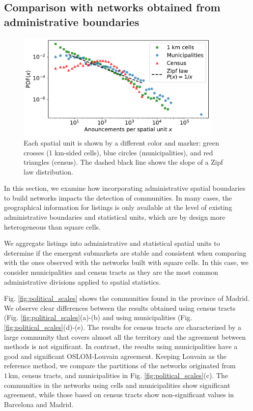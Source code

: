 \subsection{Comparison with networks obtained from administrative boundaries}\label{sec:political spatial units}

\begin{figure}
    \label{fig:distribution_announcements}
    \centering
    \includegraphics[width = 0.9\textwidth]{Figs/Idealista_segmentation/Distribution_adds_census_cell.pdf}
	\caption[Distribution of listings for different spatial units.]{ Each spatial unit is shown by a different color and marker: green crosses (1 km-sided cells), blue circles (municipalities), and red triangles (census). The dashed black line shows the slope of a Zipf law distribution.}
\end{figure}

In this section, we examine how incorporating administrative spatial boundaries to build networks impacts the detection of communities. In many cases, the geographical information for listings is only available at the level of existing administrative boundaries and statistical units, which are by design more heterogeneous than square cells.

We aggregate listings into administrative and statistical spatial units to determine if the emergent submarkets are stable and consistent when comparing with the ones observed with the networks built with square cells. In this case, we consider municipalities and census tracts as they are the most common administrative divisions applied to spatial statistics. 

Fig. \ref{fig:political_scales} shows the communities found in the province of Madrid. We observe clear differences between the results obtained using census tracts (Fig. \ref{fig:political_scales}(a)-(b) and using municipalities (Fig. \ref{fig:political_scales}(d)-(e). The results for census tracts are characterized by a large community that covers almost all the territory and the agreement between methods is not significant. In contrast, the results using municipalities have a good and significant OSLOM-Louvain agreement. Keeping Louvain as the reference method, we compare the partitions of the networks originated from $1  \, \textrm{km}$, census tracts, and municipalities in Fig. \ref{fig:political_scales}(c). The communities in the networks using cells and municipalities show significant agreement, while those based on census tracts show non-significant values in Barcelona and Madrid.

